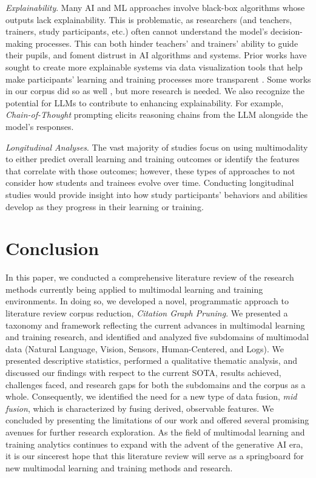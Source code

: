\documentclass[manuscript,screen,review]{acmart}
\begin{document}
\textit{Explainability}. Many AI and ML approaches involve black-box algorithms whose outputs lack explainability. This is problematic, as researchers (and teachers, trainers, study participants, etc.) often cannot understand the model's decision-making processes. This can both hinder teachers' and trainers' ability to guide their pupils, and foment distrust in AI algorithms and systems. Prior works have sought to create more explainable systems via data visualization tools that help make participants' learning and training processes more transparent \cite{hutchins2022co,vatral2023comparative,davalos2023chimerapy}. Some works in our corpus did so as well \cite{2609260641,2879332689}, but more research is needed. We also recognize the potential for LLMs to contribute to enhancing explainability. For example, \textit{Chain-of-Thought} prompting \cite{wei2022chain,cohn2023chain} elicits reasoning chains from the LLM alongside the model's responses.

\textit{Longitudinal Analyses}. The vast majority of studies focus on using multimodality to either predict overall learning and training outcomes or identify the features that correlate with those outcomes; however, these types of approaches to not consider how students and trainees evolve over time. Conducting longitudinal studies would provide insight into how study participants' behaviors and abilities develop as they progress in their learning or training. 

\section{Conclusion}
In this paper, we conducted a comprehensive literature review of the research methods currently being applied to multimodal learning and training environments. In doing so, we developed a novel, programmatic approach to literature review corpus reduction, \textit{Citation Graph Pruning}. We presented a taxonomy and framework reflecting the current advances in multimodal learning and training research, and identified and analyzed five subdomains of multimodal data (Natural Language, Vision, Sensors, Human-Centered, and Logs). We presented descriptive statistics, performed a qualitative thematic analysis, and discussed our findings with respect to the current SOTA, results achieved, challenges faced, and research gaps for both the subdomains and the corpus as a whole. Consequently, we identified the need for a new type of data fusion, \textit{mid fusion}, which is characterized by fusing derived, observable features. We concluded by presenting the limitations of our work and offered several promising avenues for further research exploration. As the field of multimodal learning and training analytics continues to expand with the advent of the generative AI era, it is our sincerest hope that this literature review will serve as a springboard for new multimodal learning and training methods and research.
\end{document}
